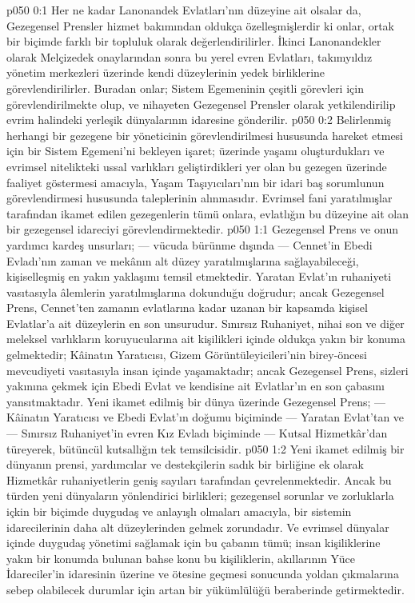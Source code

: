 \vs p050 0:1 Her ne kadar Lanonandek Evlatları’nın düzeyine ait olsalar da, Gezegensel Prensler hizmet bakımından oldukça özelleşmişlerdir ki onlar, ortak bir biçimde farklı bir topluluk olarak değerlendirilirler. İkinci Lanonandekler olarak Melçizedek onaylarından sonra bu yerel evren Evlatları, takımyıldız yönetim merkezleri üzerinde kendi düzeylerinin yedek birliklerine görevlendirilirler. Buradan onlar; Sistem Egemeninin çeşitli görevleri için görevlendirilmekte olup, ve nihayeten Gezegensel Prensler olarak yetkilendirilip evrim halindeki yerleşik dünyalarının idaresine gönderilir.
\vs p050 0:2 Belirlenmiş herhangi bir gezegene bir yöneticinin görevlendirilmesi hususunda hareket etmesi için bir Sistem Egemeni’ni bekleyen işaret; üzerinde yaşamı oluşturdukları ve evrimsel nitelikteki ussal varlıkları geliştirdikleri yer olan bu gezegen üzerinde faaliyet göstermesi amacıyla, Yaşam Taşıyıcıları’nın bir idari baş sorumlunun görevlendirmesi hususunda taleplerinin alınmasıdır. Evrimsel fani yaratılmışlar tarafından ikamet edilen gezegenlerin tümü onlara, evlatlığın bu düzeyine ait olan bir gezegensel idareciyi görevlendirmektedir.
\vs p050 1:1 Gezegensel Prens ve onun yardımcı kardeş unsurları; --- vücuda bürünme dışında --- Cennet’in Ebedi Evladı’nın zaman ve mekânın alt düzey yaratılmışlarına sağlayabileceği, kişiselleşmiş en yakın yaklaşımı temsil etmektedir. Yaratan Evlat’ın ruhaniyeti vasıtasıyla âlemlerin yaratılmışlarına dokunduğu doğrudur; ancak Gezegensel Prens, Cennet’ten zamanın evlatlarına kadar uzanan bir kapsamda kişisel Evlatlar’a ait düzeylerin en son unsurudur. Sınırsız Ruhaniyet, nihai son ve diğer meleksel varlıkların koruyucularına ait kişilikleri içinde oldukça yakın bir konuma gelmektedir; Kâinatın Yaratıcısı, Gizem Görüntüleyicileri’nin birey\hyp{}öncesi mevcudiyeti vasıtasıyla insan içinde yaşamaktadır; ancak Gezegensel Prens, sizleri yakınına çekmek için Ebedi Evlat ve kendisine ait Evlatlar’ın en son çabasını yansıtmaktadır. Yeni ikamet edilmiş bir dünya üzerinde Gezegensel Prens; --- Kâinatın Yaratıcısı ve Ebedi Evlat’ın doğumu biçiminde --- Yaratan Evlat’tan ve --- Sınırsız Ruhaniyet’in evren Kız Evladı biçiminde --- Kutsal Hizmetkâr’dan türeyerek, bütüncül kutsallığın tek temsilcisidir.
\vs p050 1:2 Yeni ikamet edilmiş bir dünyanın prensi, yardımcılar ve destekçilerin sadık bir birliğine ek olarak Hizmetkâr ruhaniyetlerin geniş sayıları tarafından çevrelenmektedir. Ancak bu türden yeni dünyaların yönlendirici birlikleri; gezegensel sorunlar ve zorluklarla içkin bir biçimde duygudaş ve anlayışlı olmaları amacıyla, bir sistemin idarecilerinin daha alt düzeylerinden gelmek zorundadır. Ve evrimsel dünyalar içinde duygudaş yönetimi sağlamak için bu çabanın tümü; insan kişiliklerine yakın bir konumda bulunan bahse konu bu kişiliklerin, akıllarının Yüce İdareciler’in idaresinin üzerine ve ötesine geçmesi sonucunda yoldan çıkmalarına sebep olabilecek durumlar için artan bir yükümlülüğü beraberinde getirmektedir.
